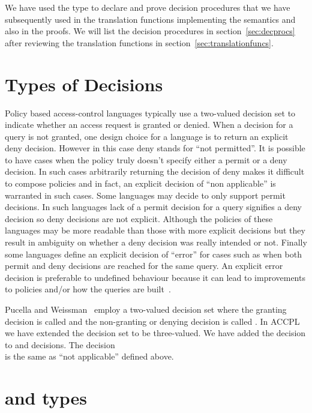 We have used the  type to declare and prove decision procedures that we have subsequently used in the translation functions implementing the semantics and also in the proofs. We will list the decision procedures in section~\ref{sec:decprocs} after reviewing the translation functions in section~\ref{sec:translationfuncs}.


\section{Types of Decisions}

Policy based access-control languages typically use a two-valued decision set to indicate whether an access request is granted or denied. When a decision for a query is not granted, one design choice for a language is to return an explicit deny decision. However in this case deny stands for ``not permitted''. It is possible to have cases when the policy truly doesn't specify either a permit or a deny decision. In such cases arbitrarily returning the decision of deny makes it difficult to compose policies and in fact, an explicit decision of ``non applicable'' is warranted in such cases. Some languages may decide to only support permit decisions. In such languages lack of a permit decision for a query signifies a deny decision so deny decisions are not explicit. Although the policies of these languages may be more readable than those with more explicit decisions but they result in ambiguity on whether a deny decision was really intended or not. Finally some languages define an explicit decision of ``error'' for cases such as when both permit and deny decisions are reached for the same query. An explicit error decision is preferable to undefined behaviour because it can lead to improvements to policies and/or how the queries are built~\cite{Tschantz}. 

Pucella and Weissman~\cite{pucella2006} employ a two-valued decision set where the granting decision is called  and the non-granting or denying decision is called . In \ac{ACCPL} we have extended the decision set to be three-valued. We have added the  decision to  and  decisions. The decision \\ is the same as ``not applicable'' defined above.


\section{ and  types}\label{sec:answerandresulttypes}

